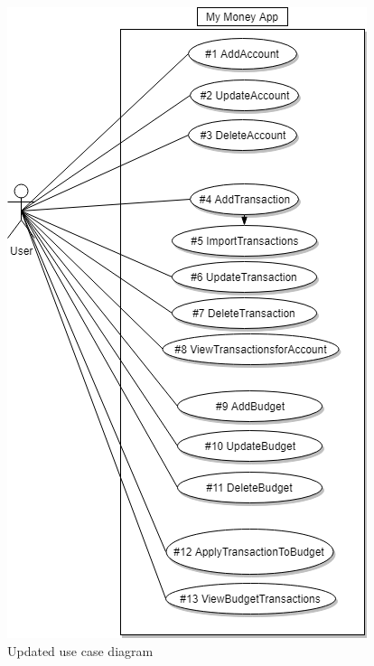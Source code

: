\documentclass[12pt]{article}
\begin{document}
\begin{figure}[H]
\centering
\caption{Updated use case diagram}
\includegraphics[scale=0.5]{Diagrams/UML/SOEN.png}
\end{figure}
\end{document}
